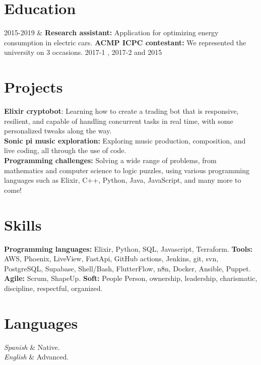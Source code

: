 \documentclass[
    changecolor={111, 156, 45}, 
]{cv-roald}
\begin{document}
\section*{Education}
\begin{tabularcv}
2015-2019   &    
\newline
                \textbf{Research assistant:} Application for optimizing energy consumption in electric cars.
                \newline
                \textbf{ACMP ICPC contestant:} We represented the university on 3 occasions. 2017-1 , 2017-2  and 2015 
                \\
                
                
\end{tabularcv}

\section*{Projects}

\textbf{Elixir cryptobot}: Learning how to create a trading bot that is responsive, resilient, and capable of handling concurrent tasks in real time, with some personalized tweaks along the way. \\
\textbf{Sonic pi music exploration:} Exploring music production, composition, and live coding, all through the use of code. \\
\textbf{Programming challenges:} Solving a wide range of problems, from mathematics and computer science to logic puzzles, using various programming languages such as Elixir, C++, Python, Java, JavaScript, and many more to come!
\section*{Skills}
	\textbf{Programming languages:} Elixir, Python, SQL, Javascript, Terraform.
    \textbf{Tools:} AWS, Phoenix, LiveView, FastApi, GitHub actions, Jenkins, git, svn, PostgreSQL, Supabase, Shell/Bash, FlutterFlow, n8n, Docker, Ansible, Puppet. \textbf{Agile:} Scrum, ShapeUp. \textbf{Soft:} People Person, ownership, leadership, charismatic, discipline, respectful, organized.


\section*{Languages}
\begin{tabularcv}
\textit{Spanish}     &	Native. \\
\textit{English} & Advanced.\\
\end{tabularcv}

    
\end{document}
